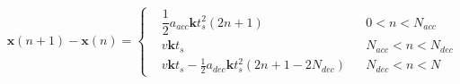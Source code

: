 \documentclass{tufte-handout}
\begin{document}
\[
    \mathbf x(n+1)- \mathbf x(n) = \left\{\begin{aligned}
         & \dfrac{1}{2} a_{acc} \mathbf k t_s^2(2n+1)                      &  & 0<n<N_{acc}       \\
         & v\mathbf kt_s                                                   &  & N_{acc}<n<N_{dec} \\
         & v \mathbf k t_s-\frac{1}{2} a_{dec} \mathbf k t_s^2(2n+1-2N_{dec}) &  & N_{dec}<n<N
    \end{aligned}\right.
\]
\end{document}
